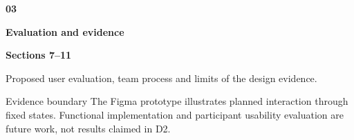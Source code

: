 \documentclass[12pt,a4paper]{article}
\begin{document}
\begin{minipage}[t]{0.315\textwidth}
\begin{tcolorbox}[height=4.72cm,enhanced,colback=RowGray,colframe=RuleGray,
  boxrule=0.55pt,arc=1.4mm,borderline north={2.5pt}{0pt}{Teal},
  left=10pt,right=9pt,top=11pt,bottom=8pt,before skip=0pt,after skip=0pt]
{\sffamily\color{Teal}\large\bfseries 03}\par\vspace{0.12cm}
{\sffamily\color{Navy}\small\bfseries Evaluation and evidence}\par\vspace{0.10cm}
{\sffamily\scriptsize\bfseries\color{Teal}Sections 7--11}\par\vspace{0.18cm}
{\small\raggedright Proposed user evaluation, team process and limits of the design evidence.\par}
\end{tcolorbox}
\end{minipage}\par
\vspace{0.35cm}
\begin{insightbox}{Evidence boundary}
The Figma prototype illustrates planned interaction through fixed states. Functional implementation and participant usability evaluation are future work, not results claimed in D2.
\end{insightbox}


\clearpage
\begingroup
\makeatletter
\setlength{\parskip}{0pt}
\setcounter{tocsecn}{0}

\def\tocfolio{1.2cm}   %
\def\tocrin{11pt}      %

\newcommand{\tochead}[2]{%
  \noindent{\sffamily\bfseries\footnotesize\color{Teal}FOOTPRINT LENS}\hfill
  {\sffamily\bfseries\footnotesize\color{Slate}D2\ /\ CONTENTS\ \textcolor{Teal}{#1\,/\,2}}\par
  \vspace{6pt}
  \noindent{\sffamily\fontsize{28}{31}\selectfont\bfseries\color{Navy}Contents}\hfill
  {\sffamily\fontsize{15}{18}\selectfont\bfseries\color{Teal}#2}\par
  \vspace{3pt}
  {\color{Teal}\hrule height 1pt}\par
  \vspace{14pt}%
}
\end{document}
